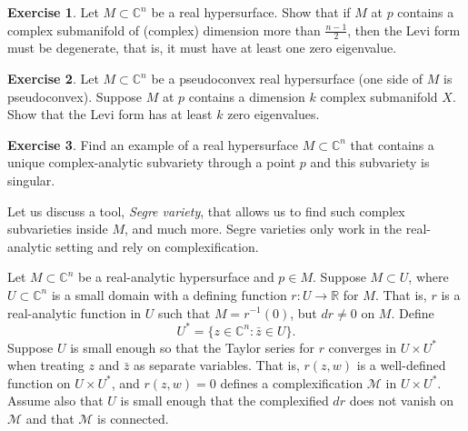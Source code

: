 \documentclass[12pt,openany]{book}
\newcommand{\C}{{\mathbb{C}}}
\newcommand{\R}{{\mathbb{R}}}
\newcommand{\sM}{{\mathscr{M}}}
\newcommand{\myindex}[1]{#1\index{#1}}
\theoremstyle{plain}
\theoremstyle{remark}
\theoremstyle{definition}
\newenvironment{exbox}{%
    \def\FrameCommand{\vrule width 1pt \relax\hspace {10pt}}%
    \MakeFramed {\advance \hsize -\width \FrameRestore }%
}{%
    \endMakeFramed
}
\theoremstyle{exercise}
\newtheorem{exercise}{Exercise}[section]
\theoremstyle{example}
\begin{document}
\begin{exbox}
\begin{exercise}
Let $M \subset \C^n$ be a real hypersurface.
Show that if $M$ at $p$ contains a complex submanifold of (complex)
dimension more than
$\frac{n-1}{2}$, then the Levi form must be degenerate, that is, it must
have at least one zero eigenvalue.
\end{exercise}

\begin{exercise}
Let $M \subset \C^n$ be a pseudoconvex real hypersurface
(one side of $M$ is pseudoconvex).
Suppose $M$ at $p$ contains a dimension $k$ complex submanifold $X$.
Show that the Levi form has at least $k$ zero eigenvalues.
\end{exercise}

\begin{exercise}
Find an example of a real hypersurface $M \subset \C^n$ that contains a unique
complex-analytic subvariety through a point $p$ and this subvariety is singular.
\end{exercise}
\end{exbox}


Let us discuss a tool, \emph{\myindex{Segre variety}}, that allows us to
find such complex subvarieties inside $M$, and much more.  Segre varieties only
work in the real-analytic setting and rely on complexification.

Let $M \subset \C^n$ be a real-analytic hypersurface and $p \in M$.
Suppose $M \subset U$,
where $U \subset \C^n$ is a small domain with a defining function $r \colon
U  \to \R$ for $M$.  That is, $r$ is a real-analytic function in $U$ such that
$M = r^{-1}(0)$, but
$dr \not= 0$ on $M$.  Define
%
\begin{equation*}
U^* = \bigl\{ z \in \C^n : \bar{z} \in U \bigr\} .
\end{equation*}
Suppose $U$ is small enough so that the Taylor series for $r$
converges in $U \times U^*$ when treating $z$ and $\bar{z}$ as separate
variables.  That is, $r(z,w)$ is a well-defined function on
$U \times U^*$, and $r(z,w) = 0$ defines a complexification $\sM$
in $U \times U^*$.  Assume also that $U$ is small enough that
the complexified
$dr$ does not vanish on $\sM$ and that $\sM$ is connected.
\end{document}
